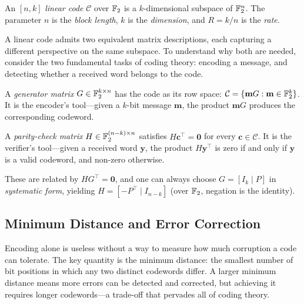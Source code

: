 \begin{definition}
\label{def:linear-code}
An $[n, k]$ \emph{linear code} $\mathcal{C}$ over $\mathbb{F}_2$ is a $k$-dimensional subspace of $\mathbb{F}_2^n$.  The parameter $n$ is the \emph{block length}, $k$ is the \emph{dimension}, and $R = k/n$ is the \emph{rate}.
\end{definition}

A linear code admits two equivalent matrix descriptions, each capturing a different perspective on the same subspace.  To understand why both are needed, consider the two fundamental tasks of coding theory: encoding a message, and detecting whether a received word belongs to the code.

\begin{definition}
\label{def:generator-parity}
A \emph{generator matrix} $G \in \mathbb{F}_2^{k \times n}$ has the code as its row space: $\mathcal{C} = \{\mathbf{m}G : \mathbf{m} \in \mathbb{F}_2^k\}$.  It is the encoder's tool---given a $k$-bit message $\mathbf{m}$, the product $\mathbf{m}G$ produces the corresponding codeword.

A \emph{parity-check matrix} $H \in \mathbb{F}_2^{(n-k) \times n}$ satisfies $H\mathbf{c}^\top = \mathbf{0}$ for every $\mathbf{c} \in \mathcal{C}$.  It is the verifier's tool---given a received word $\mathbf{y}$, the product $H\mathbf{y}^\top$ is zero if and only if $\mathbf{y}$ is a valid codeword, and non-zero otherwise.

These are related by $HG^\top = \mathbf{0}$, and one can always choose $G = [I_k \mid P]$ in \emph{systematic form}, yielding $H = [-P^\top \mid I_{n-k}]$ (over $\mathbb{F}_2$, negation is the identity).
\end{definition}


\subsection{Minimum Distance and Error Correction}
\label{subsec:min-distance}

Encoding alone is useless without a way to measure how much corruption a code can tolerate.  The key quantity is the minimum distance: the smallest number of bit positions in which any two distinct codewords differ.  A larger minimum distance means more errors can be detected and corrected, but achieving it requires longer codewords---a trade-off that pervades all of coding theory.


